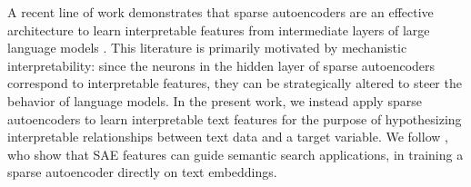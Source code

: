 A recent line of work demonstrates that sparse autoencoders \citep{makhzani_ksparse_2014} are an effective architecture to learn interpretable features from intermediate layers of large language models \citep{cunningham2023sparse, bricken2023towards, templeton2024scaling, bills2023language}. This literature is primarily motivated by mechanistic interpretability: since the neurons in the hidden layer of sparse autoencoders correspond to interpretable features, they can be strategically altered to steer the behavior of language models. In the present work, we instead apply sparse autoencoders to learn interpretable text features for the purpose of hypothesizing interpretable relationships between text data and a target variable. We follow \citet{oneill_disentangling_2024}, who show that SAE features can guide semantic search applications, in training a sparse autoencoder directly on text embeddings.

